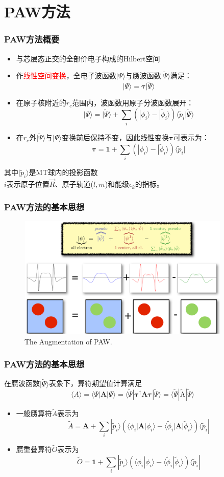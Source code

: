 \section{\rm{PAW}方法}
\frame
{
	\frametitle{\textrm{PAW}方法概要}
\begin{itemize}
	\item 与芯层态正交的全部价电子构成的\textrm{Hilbert}空间%
	\item 作\textcolor{red}{线性空间变换}，全电子波函数$|\Psi\rangle$与赝波函数$|\tilde\Psi\rangle$满足：
		$$|\Psi\rangle=\mathbf{\tau|}\tilde\Psi\rangle$$
	\item 在原子核附近的$r_c$范围内，波函数用原子分波函数展开：
	$$|\Psi\rangle=|\tilde\Psi\rangle+\sum_i(|\phi_i\rangle-|\tilde\phi_i\rangle)\langle\tilde p_i|\tilde\Psi\rangle$$
	\item 在$r_c$外$|\tilde\Psi\rangle$与$|\Psi\rangle$变换前后保持不变，因此线性变换$\mathbf{\tau}$可表示为：
	$$\mathbf{\tau}=\mathbf{1}+\sum_i(|\phi_i\rangle-|\tilde\phi_i\rangle)\langle\tilde p_i|$$
\end{itemize}
其中$|\tilde p_i\rangle$是\textrm{MT}球内的投影函数\\
$i$表示原子位置$\vec R$、原子轨道($l,m$)和能级$\epsilon_k$的指标。
}

\frame
{
	\frametitle{\textrm{PAW}方法的基本思想}
\begin{figure}[h!]
\centering
\includegraphics[height=2.3in,width=4.0in,viewport=0 0 1280 745,clip]{Figures/PAW-baseset.png}
\caption{\tiny \textrm{The Augmentation of PAW.}}%
\label{PAW_baseset}
\end{figure}
}

\frame
{
\frametitle{\textrm{PAW}方法的基本思想}
	在赝波函数$|\tilde\Psi\rangle$表象下，算符期望值计算满足$$\langle A \rangle=\langle\Psi|\mathbf{A}|\Psi\rangle=\langle\tilde\Psi|\mathbf{\tau}^{\dag}\mathbf{A}\mathbf{\tau}|\tilde\Psi\rangle=\langle\tilde\Psi|\tilde{\mathrm{A}}|\tilde\Psi\rangle$$
\begin{itemize}
	\item 一般赝算符$\tilde A$表示为
		$$\tilde A=\mathbf{A}+\sum_i|\tilde p_i\rangle(\langle\phi_i|\mathbf{A}|\phi_i\rangle-\langle\tilde\phi_i|\mathbf{A}|\tilde\phi_i\rangle)\langle\tilde p_i|$$
	\item 赝重叠算符$\tilde O$表示为
		$$\tilde O=\mathbf{1}+\sum_i|\tilde p_i\rangle(\langle\phi_i|\phi_i\rangle-\langle\tilde\phi_i|\tilde\phi_i\rangle)\langle\tilde p_i|$$
\end{itemize}
}

